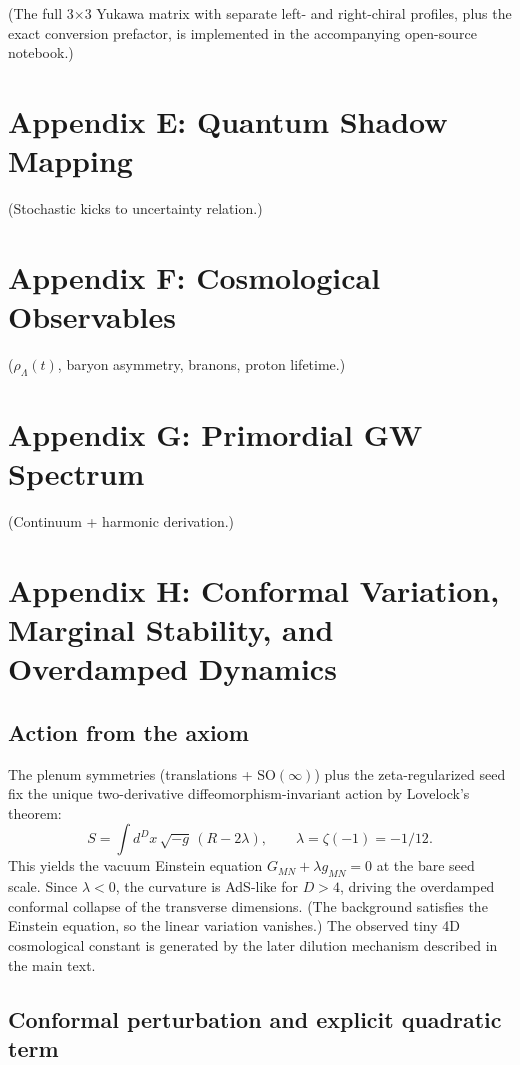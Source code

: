 \documentclass[11pt,a4paper,oneside]{article}
\begin{document}
(The full 3\(\times\)3 Yukawa matrix with separate left- and right-chiral profiles, plus the exact conversion prefactor, is implemented in the accompanying open-source notebook.)

\section{Appendix E: Quantum Shadow Mapping}
(Stochastic kicks to uncertainty relation.)

\section{Appendix F: Cosmological Observables}
(\(\rho_\Lambda(t)\), baryon asymmetry, branons, proton lifetime.)

\section{Appendix G: Primordial GW Spectrum}
(Continuum + harmonic derivation.)

\section{Appendix H: Conformal Variation, Marginal Stability, and Overdamped Dynamics}
\label{app:conformal}

\subsection{Action from the axiom}

The plenum symmetries (translations + \(\mathrm{SO}(\infty)\)) plus the zeta-regularized seed fix the unique two-derivative diffeomorphism-invariant action by Lovelock's theorem:
\[
S = \int d^D x\,\sqrt{-g}\,(R - 2\lambda), \qquad \lambda = \zeta(-1) = -1/12.
\]
This yields the vacuum Einstein equation \(G_{MN} + \lambda g_{MN} = 0\) at the bare seed scale. Since \(\lambda < 0\), the curvature is AdS-like for \(D > 4\), driving the overdamped conformal collapse of the transverse dimensions. (The background satisfies the Einstein equation, so the linear variation vanishes.) The observed tiny 4D cosmological constant is generated by the later dilution mechanism described in the main text.

\subsection{Conformal perturbation and explicit quadratic term}
\end{document}
